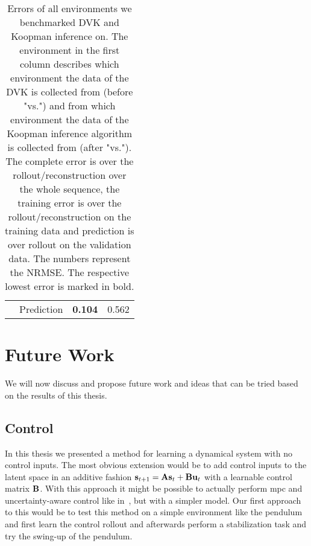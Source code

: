 \begin{table}
\begin{tabular}{c|c|c|c}
				                              &       Prediction       &          \textbf{0.104}           &           0.562
			\end{tabular}
			\caption{Errors of all environments we benchmarked DVK and Koopman inference on. The environment in the first column describes which environment the data of the DVK is collected from (before "vs.") and from which environment the data of the Koopman inference algorithm is collected from (after "vs."). The complete error is over the rollout/reconstruction over the whole sequence, the training error is over the rollout/reconstruction on the training data and prediction is over rollout on the validation data. The numbers represent the NRMSE. The respective lowest error is marked in bold.}
			\label{tab:mortonComparison}
		\end{table}

%

\section{Future Work}
	\label{sec:futureWork}

	We will now discuss and propose future work and ideas that can be tried based on the results of this thesis.

	\subsection{Control}
		In this thesis we presented a method for learning a dynamical system with no control inputs. The most obvious extension would be to add control inputs to the latent space in an additive fashion \( \boldsymbol{\mathrm{s}}_{t + 1} = \boldsymbol{\mathrm{A}} \boldsymbol{\mathrm{s}}_t + \boldsymbol{\mathrm{B}} \boldsymbol{\mathrm{u}}_t \) with a learnable control matrix \(\boldsymbol{\mathrm{B}}\). With this approach it might be possible to actually perform \ac{mpc} and uncertainty-aware control like in~\cite{mortonDeepVariationalKoopman2019a}, but with a simpler model. Our first approach to this would be to test this method on a simple environment like the pendulum and first learn the control rollout and afterwards perform a stabilization task and try the swing-up of the pendulum.

